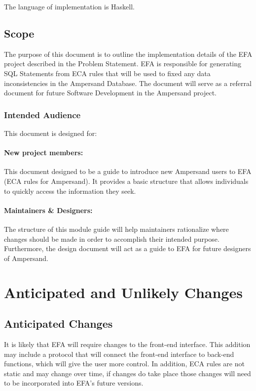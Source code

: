 \documentclass[12pt, svgnames]{article}
\begin{document}
The language of implementation is Haskell.

\subsection{Scope}
The purpose of this document is to outline the implementation details of the 
EFA project described in the Problem Statement.
EFA is responsible for generating SQL Statements from ECA rules that will 
be used to fixed any data inconsistencies in the Ampersand Database. 
The document will serve as a referral document for future Software Development in the Ampersand project.

\subsubsection{Intended Audience}
This document is designed for:
\paragraph{New project members:}
This document designed to be a guide to introduce new Ampersand users to EFA 
(ECA rules for Ampersand). It provides a basic structure that allows 
individuals to quickly access the information they seek.
   
\paragraph{Maintainers \& Designers:} The structure of this module guide will 
help maintainers rationalize where changes should be made in order to 
accomplish their intended purpose. Furthermore, the design document will act as 
a guide to EFA for future designers of Ampersand.

\section{Anticipated and Unlikely Changes}
\subsection{Anticipated Changes}
It is likely that EFA will require changes to the front-end interface. This 
addition may include a protocol that will connect the front-end interface to 
back-end functions, which will give the user more control. In addition, ECA 
rules are not static and may change over time, if changes do take place those 
changes will need to be incorporated into EFA's future versions. 
\end{document}

